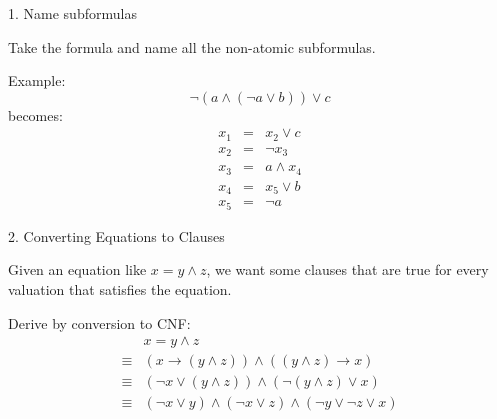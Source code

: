 \documentclass[xetex,aspectratio=169,14pt,hyperref={pdfpagelabels=true,pdflang={en-GB}}]{beamer}
\begin{document}
\begin{frame}[t]
  {1. Name subformulas}

  Take the formula and name all the non-atomic subformulas.

  \medskip

  Example:
  \begin{displaymath}
    \lnot(a \land (\lnot a \lor b)) \lor c
  \end{displaymath}
  becomes:
  \begin{displaymath}
    \begin{array}{lcl}
      x_1&=&x_2 \lor c \\
      x_2&=&\lnot x_3 \\
      x_3&=&a \land x_4 \\
      x_4&=&x_5 \lor b\\
      x_5&=&\lnot a
    \end{array}
  \end{displaymath}
\end{frame}

\begin{frame}
  {2. Converting Equations to Clauses}

  Given an equation like $x = y \land z$, we want some clauses that
  are true for every valuation that satisfies the equation.

  \pause
  \bigskip

  Derive by conversion to CNF:
  \begin{displaymath}
    \begin{array}{cl}
      &x = y \land z \\
      \equiv&(x \to (y \land z)) \land ((y \land z) \to x) \\
      \equiv&(\lnot x \lor (y \land z)) \land (\lnot(y \land z) \lor x)\\
      \equiv&(\lnot x \lor y) \land (\lnot x \lor z) \land (\lnot y \lor \lnot z \lor x)
    \end{array}
  \end{displaymath}

\end{frame}
\end{document}
